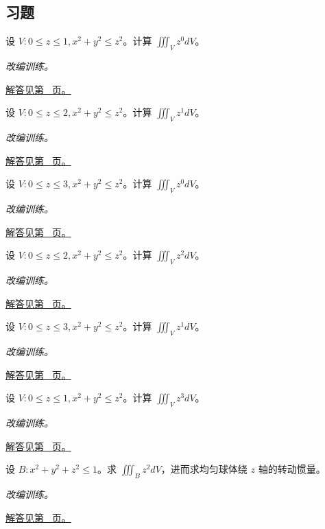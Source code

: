 \documentclass[12pt,fontset=fandol]{ctexart}
\begin{document}
\subsection{习题}
\begin{example}[圆锥的分层积分]\label{ex:c39q1}
设 $V:0\le z\le 1, x^2+y^2\le z^2$。计算 $\iiint_Vz^{0}dV$。
\par\textit{改编训练。}\par\hyperref[ans:c39q1]{解答见第~\pageref{ans:c39q1} 页。}
\end{example}
\begin{example}[圆锥的分层积分]\label{ex:c39q2}
设 $V:0\le z\le 2, x^2+y^2\le z^2$。计算 $\iiint_Vz^{1}dV$。
\par\textit{改编训练。}\par\hyperref[ans:c39q2]{解答见第~\pageref{ans:c39q2} 页。}
\end{example}
\begin{example}[圆锥的分层积分]\label{ex:c39q3}
设 $V:0\le z\le 3, x^2+y^2\le z^2$。计算 $\iiint_Vz^{0}dV$。
\par\textit{改编训练。}\par\hyperref[ans:c39q3]{解答见第~\pageref{ans:c39q3} 页。}
\end{example}
\begin{example}[圆锥的分层积分]\label{ex:c39q4}
设 $V:0\le z\le 2, x^2+y^2\le z^2$。计算 $\iiint_Vz^{2}dV$。
\par\textit{改编训练。}\par\hyperref[ans:c39q4]{解答见第~\pageref{ans:c39q4} 页。}
\end{example}
\begin{example}[圆锥的分层积分]\label{ex:c39q5}
设 $V:0\le z\le 3, x^2+y^2\le z^2$。计算 $\iiint_Vz^{1}dV$。
\par\textit{改编训练。}\par\hyperref[ans:c39q5]{解答见第~\pageref{ans:c39q5} 页。}
\end{example}
\begin{example}[圆锥的分层积分]\label{ex:c39q6}
设 $V:0\le z\le 1, x^2+y^2\le z^2$。计算 $\iiint_Vz^{3}dV$。
\par\textit{改编训练。}\par\hyperref[ans:c39q6]{解答见第~\pageref{ans:c39q6} 页。}
\end{example}
\begin{example}[球内坐标平方的积分]\label{ex:c39q7}
设 $B:x^2+y^2+z^2\le 1$。求 $\iiint_Bz^2dV$，进而求均匀球体绕 $z$ 轴的转动惯量。
\par\textit{改编训练。}\par\hyperref[ans:c39q7]{解答见第~\pageref{ans:c39q7} 页。}
\end{example}
\end{document}
